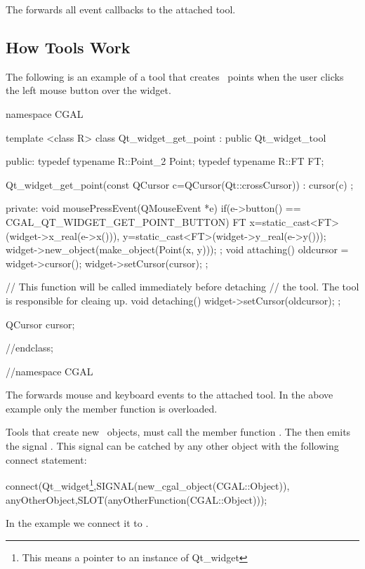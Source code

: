 
The  forwards all event callbacks to the attached tool.


\subsection{How Tools Work}

The following is an example of a tool that creates \cgal\ points when the user 
clicks the left mouse button over the widget. 
 
\begin{ccExampleCode}
namespace CGAL {

template <class R>
class Qt_widget_get_point : public Qt_widget_tool
{
public:
  typedef typename R::Point_2   Point;
  typedef typename R::FT        FT;
  
  Qt_widget_get_point(const QCursor c=QCursor(Qt::crossCursor)) :
    cursor(c) {};
  
private:
  void mousePressEvent(QMouseEvent *e)
  {
    if(e->button() == CGAL_QT_WIDGET_GET_POINT_BUTTON)
    {
      FT
        x=static_cast<FT>(widget->x_real(e->x())),
        y=static_cast<FT>(widget->y_real(e->y()));
      widget->new_object(make_object(Point(x, y)));
    }
  };
  void attaching()
  {
    oldcursor = widget->cursor();
    widget->setCursor(cursor);
  };
  
  // This function will be called immediately before detaching
  // the tool. The tool is responsible for cleaing up.
  void detaching()
  {
    widget->setCursor(oldcursor);
  };

  QCursor cursor;
}//endclass;
}//namespace CGAL
\end{ccExampleCode}

The  forwards mouse and keyboard events to the attached tool.
In the above example only the  member function is overloaded.

Tools that create new \cgal\ objects, must call the member 
function . The  
then emits the signal . This signal can be 
catched by any other object with the following connect statement:


connect(Qt\_widget\footnote{This means a pointer to an instance of Qt\_widget},SIGNAL(new\_cgal\_object(CGAL::Object)), anyOtherObject,SLOT(anyOtherFunction(CGAL::Object)));


In the example we connect it to .

